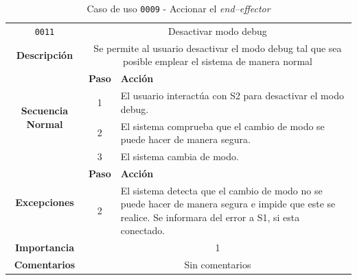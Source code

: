 \begin{table}[H]
    \centering
    \begin{tabularx}{\textwidth}{|c|c|X|}
        \cline{1-3}
        \texttt{0011}        & \multicolumn{2}{c|}{Desactivar modo debug}                                      
        \\ \cline{1-3}
        \textbf{Descripción} & \multicolumn{2}{m{13cm}|}{Se permite al usuario desactivar el modo debug tal que sea posible emplear el sistema de manera normal}
        \\ \cline{1-3}
        \multirow{4}{*}{\textbf{Secuencia Normal}} & \textbf{Paso} & \textbf{Acción}
        \\ \cline{2-3}                    &   1  & El usuario interactúa con \ac{S2} para desactivar el modo debug.
        \\ \cline{2-3}                    &   2  & El sistema comprueba que el cambio de modo se puede hacer de manera segura.
        \\ \cline{2-3}                    &   3  & El sistema cambia de modo.
        \\ \cline{1-3}
        \multirow{2}{*}{\textbf{Excepciones}} & \textbf{Paso} & \textbf{Acción}
        \\ \cline{2-3}                    &   2  & El sistema detecta que el cambio de modo no se puede hacer de manera segura e impide que este se realice. Se informara del error a \ac{S1}, si esta conectado.
        \\ \cline{1-3}
        \textbf{Importancia}                 & \multicolumn{2}{c|}{1}           
        \\ \cline{1-3}
        \textbf{Comentarios}                 & \multicolumn{2}{c|}{Sin comentarios}
        \\ \cline{1-3}
    \end{tabularx}
    \caption{Caso de uso \texttt{0009} - Accionar el \textit{end--effector}}
    \label{tab:CU0011}
    \label{tab:caso_de_uso_desactivar_modo_debug}
\end{table}